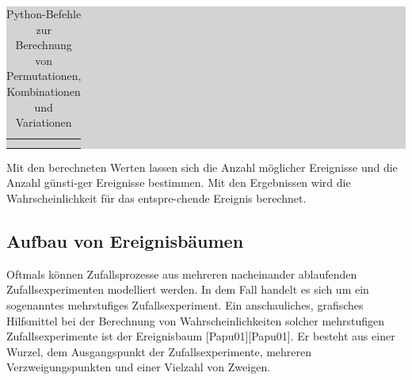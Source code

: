 \begin{table}[H]
\setlength{\arrayrulewidth}{.1em}
\caption{Python-Befehle zur Berechnung von Permutationen, Kombinationen und Variationen}
\setlength{\fboxsep}{0pt}%
\colorbox{lightgray}{%
%
\begin{tabular}{| c | c | c |}
\hline

\parbox[c][0.35in][c]{2.18in}{} &
\parbox[c][0.35in][c]{2.18in}{}&
\parbox[c][0.35in][c]{2.18in}{}\\ \hline

\parbox[c][0.35in][c]{2.18in}{} &
\parbox[c][0.35in][c]{2.18in}{}&
\parbox[c][0.35in][c]{2.18in}{}\\ \hline

\parbox[c][0.5in][c]{2.18in}{} &
\parbox[c][0.5in][c]{2.18in}{}&
\parbox[c][0.5in][c]{2.18in}{}\\ \hline

\end{tabular}%
}
\label{tab:twofour}
\end{table}

\noindent Mit den berechneten Werten lassen sich die Anzahl möglicher Ereignisse und die Anzahl günsti-ger Ereignisse bestimmen. Mit den Ergebnissen wird die Wahrscheinlichkeit für das entspre-chende Ereignis berechnet. 

\subsection{Aufbau von Ereignisbäumen}

\noindent Oftmals k\"{o}nnen Zufallsprozesse aus mehreren nacheinander ablaufenden Zufallsexperimenten modelliert werden. In dem Fall handelt es sich um ein sogenanntes mehrstufiges Zufallsexperiment. Ein anschauliches, grafisches Hilfsmittel bei der Berechnung von Wahrscheinlichkeiten solcher mehrstufigen Zufallsexperimente ist der Ereignisbaum [Papu01][Papu01]. Er besteht aus einer Wurzel, dem Ausgangspunkt der Zufallsexperimente, mehreren Verzweigungspunkten und einer Vielzahl von Zweigen.

